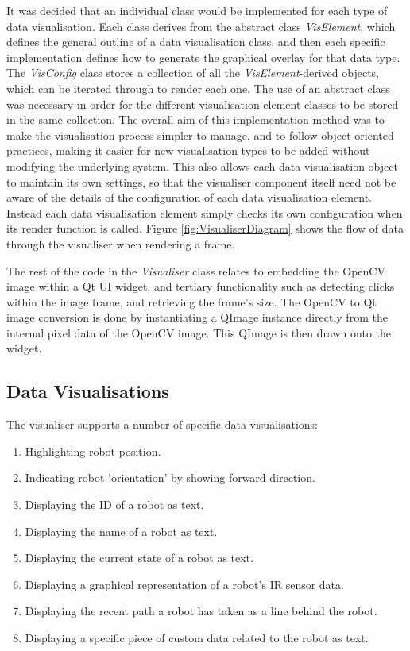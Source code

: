 It was decided that an individual class would be implemented for each type of data visualisation. Each class derives from the abstract class \textit{VisElement}, which defines the general outline of a data visualisation class, and then each specific implementation defines how to generate the graphical overlay for that data type. The \textit{VisConfig} class stores a collection of all the \textit{VisElement}-derived objects, which can be iterated through to render each one. The use of an abstract class was necessary in order for the different visualisation element classes to be stored in the same collection. The overall aim of this implementation method was to make the visualisation process simpler to manage, and to follow object oriented practices, making it easier for new visualisation types to be added without modifying the underlying system. This also allows each data visualisation object to maintain its own settings, so that the visualiser component itself need not be aware of the details of the configuration of each data visualisation element. Instead each data visualisation element simply checks its own configuration when its render function is called. Figure \ref{fig:VisualiserDiagram} shows the flow of data through the visualiser when rendering a frame.

The rest of the code in the \textit{Visualiser} class relates to embedding the OpenCV image within a Qt UI widget, and tertiary functionality such as detecting clicks within the image frame, and retrieving the frame's size. The OpenCV to Qt image conversion is done by instantiating a QImage instance directly from the internal pixel data of the OpenCV image. This QImage is then drawn onto the widget. 

\subsection{Data Visualisations}
The visualiser supports a number of specific data visualisations:

\begin{enumerate}
 \item Highlighting robot position.
 \item Indicating robot 'orientation' by showing forward direction.
 \item Displaying the ID of a robot as text.
 \item Displaying the name of a robot as text.
 \item Displaying the current state of a robot as text.
 \item Displaying a graphical representation of a robot's IR sensor data.
 \item Displaying the recent path a robot has taken as a line behind the robot.
 \item Displaying a specific piece of custom data related to the robot as text.
\end{enumerate}

